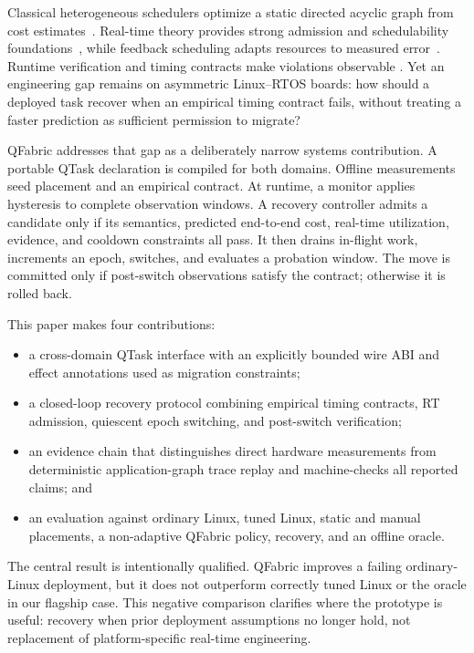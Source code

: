 \documentclass[conference]{IEEEtran}
\newcommand{\system}{QFabric\xspace}
\begin{document}
Classical heterogeneous schedulers optimize a static directed acyclic graph
from cost estimates~\cite{topcuoglu2002heft}. Real-time theory provides strong
admission and schedulability foundations~\cite{liu1973scheduling}, while
feedback scheduling adapts resources to measured error~\cite{lu2002feedback}.
Runtime verification and timing contracts make violations observable
\cite{reinbacher2014runtime,nandi2015contracts}. Yet an engineering gap remains
on asymmetric Linux--RTOS boards: how should a deployed task recover when an
empirical timing contract fails, without treating a faster prediction as
sufficient permission to migrate?

\system addresses that gap as a deliberately narrow systems contribution. A
portable QTask declaration is compiled for both domains. Offline measurements
seed placement and an empirical contract. At runtime, a monitor applies
hysteresis to complete observation windows. A recovery controller admits a
candidate only if its semantics, predicted end-to-end cost, real-time
utilization, evidence, and cooldown constraints all pass. It then drains
in-flight work, increments an epoch, switches, and evaluates a probation
window. The move is committed only if post-switch observations satisfy the
contract; otherwise it is rolled back.

This paper makes four contributions:

\begin{itemize}
  \item a cross-domain QTask interface with an explicitly bounded wire ABI and
  effect annotations used as migration constraints;
  \item a closed-loop recovery protocol combining empirical timing contracts,
  RT admission, quiescent epoch switching, and post-switch verification;
  \item an evidence chain that distinguishes direct hardware measurements from
  deterministic application-graph trace replay and machine-checks all reported
  claims; and
  \item an evaluation against ordinary Linux, tuned Linux, static and manual
  placements, a non-adaptive \system policy, recovery, and an offline oracle.
\end{itemize}

The central result is intentionally qualified. \system improves a failing
ordinary-Linux deployment, but it does not outperform correctly tuned Linux or
the oracle in our flagship case. This negative comparison clarifies where the
prototype is useful: recovery when prior deployment assumptions no longer hold,
not replacement of platform-specific real-time engineering.
\end{document}
